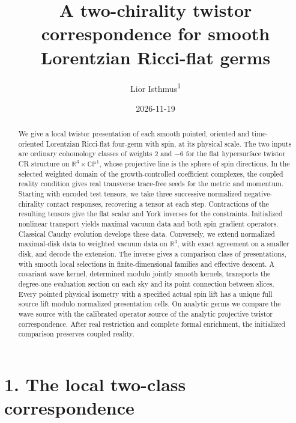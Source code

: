 \documentclass[
  english,
  11pt,
  reqno]{amsart}
\title[A two-chirality twistor correspondence]{A two-chirality twistor correspondence for smooth Lorentzian Ricci-flat germs}
\author[Lior Isthmus]{Lior Isthmus\textsuperscript{1}}
\date{2026-11-19}
\begin{document}
\begin{abstract}
\label{sec:abstract}
We give a local twistor presentation of each smooth pointed, oriented and time-oriented Lorentzian Ricci-flat four-germ with spin, at its physical scale. The two inputs are ordinary cohomology classes of weights \(2\) and \(-6\) for the flat hypersurface twistor CR structure on \(\mathbb R^3\times\mathbb{CP}^1\), whose projective line is the sphere of spin directions. In the selected weighted domain of the growth-controlled coefficient complexes, the coupled reality condition gives real transverse trace-free seeds for the metric and momentum. Starting with encoded test tensors, we take three successive normalized negative-chirality contact responses, recovering a tensor at each step. Contractions of the resulting tensors give the flat scalar and York inverses for the constraints. Initialized nonlinear transport yields maximal vacuum data and both spin gradient operators. Classical Cauchy evolution develops these data. Conversely, we extend normalized maximal-disk data to weighted vacuum data on \(\mathbb R^3\),\EndAccSupp{} with exact agreement on a smaller disk, and decode the extension. The inverse gives a comparison class of presentations, with smooth local selections in finite-dimensional families and effective descent. A covariant wave kernel, determined modulo jointly smooth kernels, transports the degree-one evaluation section on each sky and its point connection between slices. Every pointed physical isometry with a specified actual spin lift has a unique full source lift modulo normalized presentation cells. On analytic germs we compare the wave source with the calibrated operator source of the analytic projective twistor correspondence. After real restriction and complete formal enrichment, the initialized comparison preserves coupled reality.
\end{abstract}
\maketitle
{}
\setcounter{footnote}{1}


{
\setcounter{tocdepth}{1}
\clearpage
\tableofcontents
}

\section{1. The local two-class
correspondence}\label{the-local-two-class-correspondence}\label{sec:introduction}
\end{document}
